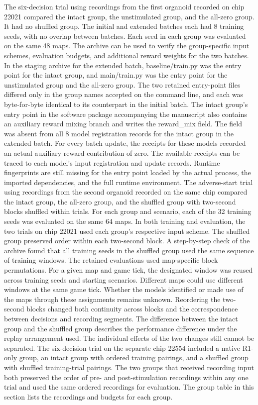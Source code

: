 \documentclass{article}
\begin{document}
The six-decision trial using recordings from the first organoid recorded on chip 22021 compared the intact group, the unstimulated group, and the all-zero group. It had no shuffled group. The initial and extended batches each had 8 training seeds, with no overlap between batches. Each seed in each group was evaluated on the same 48 maps. The archive can be used to verify the group-specific input schemes, evaluation budgets, and additional reward weights for the two batches. In the staging archive for the extended batch, baseline/train.py was the entry point for the intact group, and main/train.py was the entry point for the unstimulated group and the all-zero group. The two retained entry-point files differed only in the group names accepted on the command line, and each was byte-for-byte identical to its counterpart in the initial batch. The intact group's entry point in the software package accompanying the manuscript also contains an auxiliary reward mixing branch and writes the reward\_\allowbreak{}mix field. The field was absent from all 8 model registration records for the intact group in the extended batch. For every batch update, the receipts for these models recorded an actual auxiliary reward contribution of zero. The available receipts can be traced to each model's input registration and update records. Runtime fingerprints are still missing for the entry point loaded by the actual process, the imported dependencies, and the full runtime environment. The adverse-start trial using recordings from the second organoid recorded on the same chip compared the intact group, the all-zero group, and the shuffled group with two-second blocks shuffled within trials. For each group and scenario, each of the 32 training seeds was evaluated on the same 64 maps. In both training and evaluation, the two trials on chip 22021 used each group's respective input scheme. The shuffled group preserved order within each two-second block. A step-by-step check of the archive found that all training seeds in the shuffled group used the same sequence of training windows. The retained evaluations used map-specific block permutations. For a given map and game tick, the designated window was reused across training seeds and starting scenarios. Different maps could use different windows at the same game tick. Whether the models identified or made use of the maps through these assignments remains unknown. Reordering the two-second blocks changed both continuity across blocks and the correspondence between decisions and recording segments. The difference between the intact group and the shuffled group describes the performance difference under the replay arrangement used. The individual effects of the two changes still cannot be separated. The six-decision trial on the separate chip 22554 included a native R1-only group, an intact group with ordered training pairings, and a shuffled group with shuffled training-trial pairings. The two groups that received recording input both preserved the order of pre- and post-stimulation recordings within any one trial and used the same ordered recordings for evaluation. The group table in this section lists the recordings and budgets for each group.
\end{document}
